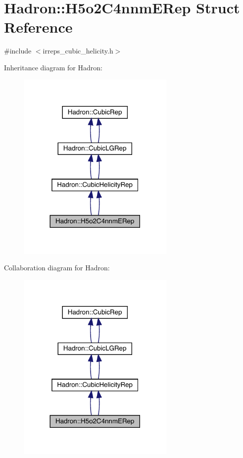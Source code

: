 \hypertarget{structHadron_1_1H5o2C4nnmERep}{}\section{Hadron\+:\+:H5o2\+C4nnm\+E\+Rep Struct Reference}
\label{structHadron_1_1H5o2C4nnmERep}


{\ttfamily \#include $<$irreps\+\_\+cubic\+\_\+helicity.\+h$>$}



Inheritance diagram for Hadron\+:\nopagebreak
\begin{figure}[H]
\begin{center}
\leavevmode
\includegraphics[width=216pt]{dc/de7/structHadron_1_1H5o2C4nnmERep__inherit__graph}
\end{center}
\end{figure}


Collaboration diagram for Hadron\+:\nopagebreak
\begin{figure}[H]
\begin{center}
\leavevmode
\includegraphics[width=216pt]{d2/dff/structHadron_1_1H5o2C4nnmERep__coll__graph}
\end{center}
\end{figure}
